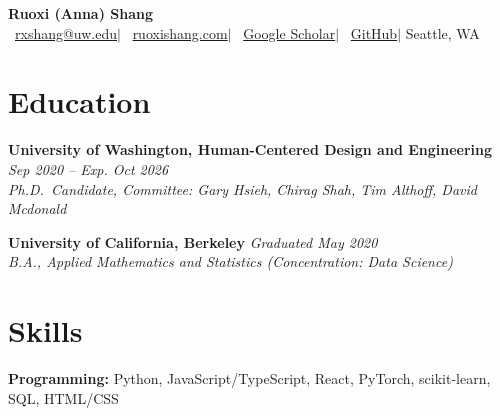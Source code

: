 \documentclass[10pt,a4paper]{article}
\newcommand{\cvheader}[6]{%
  \begin{center}
    {\LARGE\bfseries #1}\\[0.9em] 
    \small
    \faEnvelope\ \href{mailto:#2}{#2}\hspace{0.6em}$|$\hspace{0.6em}
    \faGlobe\ \href{https://#3}{#3}\hspace{0.6em}$|$\hspace{0.6em}
    \faGoogle\ \href{#4}{Google Scholar}\hspace{0.6em}$|$\hspace{0.6em}
    \faGithub\ \href{https://github.com/#5}{GitHub}\hspace{0.6em}$|$\hspace{0.6em}
    {#6}
  \end{center}\vspace{4pt} 
}
\newcommand{\experience}[4]{%
  \vspace{6pt}%
  \noindent\textbf{#1} \hfill \textit{\small #2}\\
  \textit{#3} \hfill \textit{\small #4}
}
\newcommand{\skill}[2]{%
  \vspace{4pt}
  \textbf{#1: }#2
}
\begin{document}
\cvheader
{Ruoxi (Anna) Shang}
{rxshang@uw.edu}
{ruoxishang.com}
{https://scholar.google.com/citations?user=}
{ruoxishang}
{Seattle, WA}




\section{Education}
\experience{University of Washington, Human-Centered Design and Engineering}{Sep 2020 -- Exp. Oct 2026}{Ph.D.\ Candidate, Committee: Gary Hsieh, Chirag Shah, Tim Althoff, David Mcdonald}{}

\experience{University of California, Berkeley}{Graduated May 2020}{B.A., Applied Mathematics and Statistics (Concentration: Data Science)}{}


\section{Skills}

\skill{Programming}{Python, JavaScript/TypeScript, React, PyTorch, scikit-learn, SQL, HTML/CSS}
\end{document}
